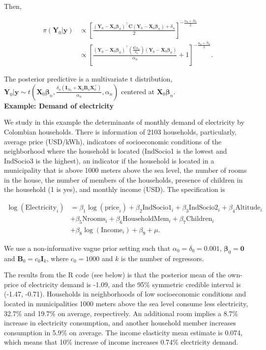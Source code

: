 Then,

\begin{align*}
	\pi({\bm{Y}}_0|{\bm{y}})&\propto\left[\frac{({\bm{Y}}_0-{\bm{X}}_0\bm{\beta}_n)^{\top}{\bm{C}}({\bm{Y}}_0-{\bm{X}}_0\bm{\beta}_n)+\delta_n}{2}\right]^{-\frac{\alpha_n+N_0}{2}}\\
	&\propto\left[\frac{({\bm{Y}}_0-{\bm{X}}_0\bm{\beta}_n)^{\top}\left(\frac{{\bm{C}}\alpha_n}{\delta_n}\right)({\bm{Y}}_0-{\bm{X}}_0\bm{\beta}_n)}{\alpha_n}+1\right]^{-\frac{\alpha_n+N_0}{2}}.
\end{align*}

The posterior predictive is a multivariate t distribution, ${\bm{Y}}_0|{\bm{y}}\sim t\left({\bm{X}}_0\bm{\beta}_n,\frac{\delta_n({\bm{I}}_{N_0}+{\bm{X}}_0{\bm{B}}_n{\bm{X}}_0^{\top})}{\alpha_n},\alpha_n\right)$ centered at ${\bm{X}}_0\bm{\beta}_n$.\\

\textbf{Example: Demand of electricity}

We study in this example the determinants of monthly demand of electricity by Colombian households. There is information of 2103 households, particularly, average price (USD/kWh), indicators of socioeconomic conditions of the neighborhood where the household is located (IndSocio1 is the lowest and IndSocio3 is the highest), an indicator if the household is located in a municipality that is above 1000 meters above the sea level, the number of rooms in the house, the number of members of the households, presence of children in the household (1 is yes), and monthly income (USD). The specification is

\begin{align*}
	\log(\text{Electricity}_i) & = \beta_1\log(\text{price}_i) + \beta_2\text{IndSocio1}_i + \beta_3\text{IndSocio2}_i + \beta_4\text{Altitude}_i \\
	& + \beta_5\text{Nrooms}_i + \beta_6\text{HouseholdMem}_i + \beta_7\text{Children}_i\\
	& + \beta_8\log(\text{Income}_i) + \beta_9 + \mu.
\end{align*}

We use a non-informative vague prior setting such that $\alpha_0=\delta_0=0.001$, $\bm{\beta}_0=\bm{0}$ and $\bm{B}_0=c_0\bm{I}_k$, where $c_0=1000$ and $k$ is the number of regressors. 

The results from the R code (see below) is that the posterior mean of the own-price of electricity demand is -1.09, and the 95\% symmetric credible interval is (-1.47, -0.71). Households in neighborhoods of low socioeconomic conditions and located in municipalities 1000 meters above the sea level consume less electricity, 32.7\% and 19.7\% on average, respectively. An additional room implies a 8.7\% increase in electricity consumption, and another household member increases consumption in 5.9\% on average. The income elasticity mean estimate is 0.074, which means that 10\% increase of income increases 0.74\% electricity demand.

